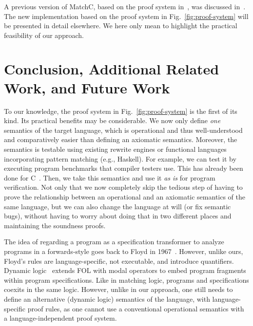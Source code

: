 \documentclass{llncs}
\begin{document}
A previous version of MatchC, based on the proof system
in~\cite{rosu-ellison-schulte-2010-amast}, was discussed
in~\cite{rosu-stefanescu-2011-nier-icse}.  The new implementation based on the
proof system in Fig.~\ref{fig:proof-system} will be presented in detail
elsewhere.  We here only mean to highlight the practical feasibility of our
approach.


\section{Conclusion, Additional Related Work, and Future Work}
\label{sec:conclusion}

To our knowledge, the proof system in Fig.~\ref{fig:proof-system} is the first
of its kind.  Its practical benefits may be considerable.  We now only define
{\em one} semantics of the target language, which is operational and thus
well-understood and comparatively easier than defining an axiomatic semantics.
Moreover, the semantics is testable using existing rewrite engines or functional
languages incorporating pattern matching (e.g., Haskell).  For example, we can
test it by executing program benchmarks that compiler testers use.  This has
already been done for C~\cite{ellison-rosu-2012-popl}.  Then, we take this
semantics and use it {\em as is} for program verification.  Not only that we now
completely skip the tedious step of having to prove the relationship between an
operational and an axiomatic semantics of the same language, but we can also
change the language at will (or fix semantic bugs), without having to worry
about doing that in two different places and maintaining the soundness proofs.

The idea of regarding a program as a specification transformer to analyze
programs in a forwards-style goes back to Floyd in
1967~\cite{Floyd:AssignMeaningProg}.  However, unlike ours, Floyd's rules are
language-specific, not executable, and introduce quantifiers.
%
Dynamic logic~\cite{Harel84dynamiclogic,KeYBook2007} extends FOL with modal
operators to embed program fragments within program specifications.  Like in
matching logic, programs and specifications coexits in the same logic.  However,
unlike in our approach, one still needs to define an alternative (dynamic logic)
semantics of the language, with language-specific proof rules, as one cannot use
a conventional operational semantics with a language-independent proof system.
\end{document}

